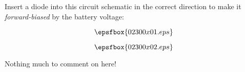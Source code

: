 

Insert a diode into this circuit schematic in the correct direction to make it {\it forward-biased} by the battery voltage:

$$\epsfbox{02300x01.eps}$$







$$\epsfbox{02300x02.eps}$$







Nothing much to comment on here!




